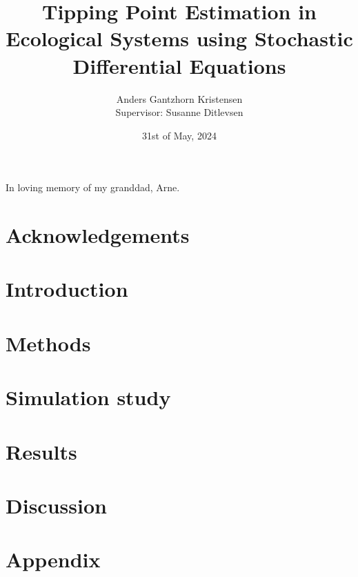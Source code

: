 \documentclass[11pt]{article}
\numberwithin{equation}{section}
\begin{document}
\pagestyle{fancy}
\fancyfoot{}
\fancyfoot[C]{\thepage}
\renewcommand{\headrulewidth}{0pt}
\renewcommand{\footrulewidth}{0pt}
\allowdisplaybreaks



\title{Tipping Point Estimation in Ecological Systems using Stochastic Differential Equations}
\author{Anders Gantzhorn Kristensen \\
Supervisor: Susanne Ditlevsen}
\date{31st of May, 2024}
\maketitle
\noindent In loving memory of my granddad, Arne.
\section*{Acknowledgements}

\newpage
\begin{abstract}
    
\end{abstract}
\newpage
\tableofcontents
\newpage
\section{Introduction}\label{Introduction}

\section{Methods}\label{Methods}

\section{Simulation study}\label{Simulaton study}

\section{Results}\label{Results}

\section{Discussion}\label{Discussion}

\newpage

\newpage
\appendix
\section*{Appendix}\label{Appendix}

\end{document}
